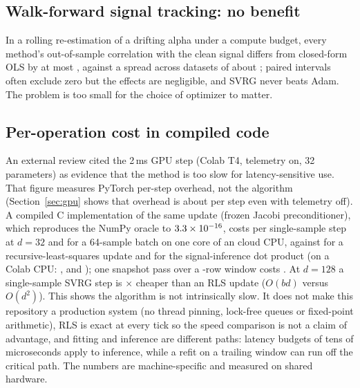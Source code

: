 \documentclass[11pt]{article}
\theoremstyle{remark}
\begin{document}
\subsection{Walk-forward signal tracking: no benefit}
In a rolling re-estimation of a drifting alpha under a compute budget, every method's out-of-sample correlation with the clean signal differs from closed-form OLS by at most \ExpThreeMaxICDiff, against a spread across datasets of about \ExpThreeIQR; paired intervals often exclude zero but the effects are negligible, and SVRG never beats Adam. The problem is too small for the choice of optimizer to matter.

\subsection{Per-operation cost in compiled code}\label{sec:latency}
An external review cited the 2\,ms GPU step (Colab T4, telemetry on, 32 parameters) as evidence that the method is too slow for latency-sensitive use. That figure measures PyTorch per-step overhead, not the algorithm (Section~\ref{sec:gpu} shows that overhead is about \GpuOffUs{} per step even with telemetry off). A compiled C implementation of the same update (frozen Jacobi preconditioner), which reproduces the NumPy oracle to $3.3\times 10^{-16}$, costs \LatSvrgOne{} per single-sample step at $d=32$ and \LatSvrgBatch{} for a 64-sample batch on one core of an \LatCpu{} cloud CPU, against \LatRls{} for a recursive-least-squares update and \LatDot{} for the signal-inference dot product (on a Colab CPU: \LatColabSvrgOne, \LatColabRls{} and \LatColabDot{}); one snapshot pass over a \LatWindow-row window costs \LatSnapshot. At $d=128$ a single-sample SVRG step is \LatRlsOverSvrgHundredTwentyEight$\times$ cheaper than an RLS update ($O(bd)$ versus $O(d^2)$).
This shows the algorithm is not intrinsically slow. It does not make this repository a production system (no thread pinning, lock-free queues or fixed-point arithmetic), RLS is exact at every tick so the speed comparison is not a claim of advantage, and fitting and inference are different paths: latency budgets of tens of microseconds apply to inference, while a refit on a trailing window can run off the critical path. The numbers are machine-specific and measured on shared hardware.
\end{document}
